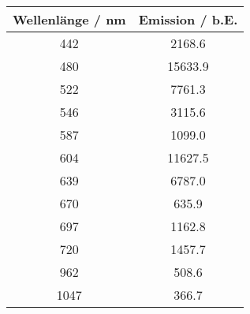 \begin{center}
\begin{tabular}{|c|c|}
\hline
Wellenlänge / nm & Emission / b.E. \\ \hline
442 & 2168.6 \\ \hline
480 & 15633.9 \\ \hline
522 & 7761.3 \\ \hline
546 & 3115.6 \\ \hline
587 & 1099.0 \\ \hline
604 & 11627.5 \\ \hline
639 & 6787.0 \\ \hline
670 & 635.9 \\ \hline
697 & 1162.8 \\ \hline
720 & 1457.7 \\ \hline
962 & 508.6 \\ \hline
1047 & 366.7 \\ \hline
\end{tabular}
\end{center}